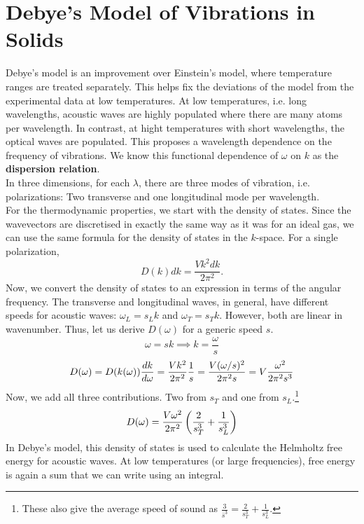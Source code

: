 \section{Debye's Model of Vibrations in Solids}
    Debye's model is an improvement over Einstein's model, where temperature ranges are treated separately. This helps fix the deviations of the model from the experimental data at low temperatures. At low temperatures, i.e. long wavelengths, acoustic waves are highly populated where there are many atoms per wavelength. In contrast, at hight temperatures with short wavelengths, the optical waves are populated. This proposes a wavelength dependence on the frequency of vibrations. We know this functional dependence of $\omega$ on $k$ as the \textbf{dispersion relation}. \\
    In three dimensions, for each $\lambda$, there are three modes of vibration, i.e. polarizations: Two transverse and one longitudinal mode per wavelength. \\
    For the thermodynamic properties, we start with the density of states. Since the wavevectors are discretised in exactly the same way as it was for an ideal gas, we can use the same formula for the density of states in the $k$-space. For a single polarization, 
    \begin{equation}
        D(k)dk = \frac{Vk^2dk}{2\pi^2}.
    \end{equation}
    Now, we convert the density of states to an expression in terms of the angular frequency. The transverse and longitudinal waves, in general, have different speeds for acoustic waves: $\omega_L=s_Lk$ and $\omega_T=s_Tk$. However, both are linear in wavenumber. Thus, let us derive $D(\omega)$ for a generic speed $s$. 
    \begin{equation}
        \omega = sk \implies k =\frac{\omega}{s}
    \end{equation}
    \begin{equation}
        D(\omega)=D(k(\omega))\frac{d k}{d \omega}=\frac{Vk^2}{2\pi^2}\frac{1}{s}=\frac{V(\omega/s)^2}{2\pi^2s}=V\frac{\omega^2}{2\pi^2s^3}
    \end{equation}
    Now, we add all three contributions. Two from $s_T$ and one from $s_L$.\footnote{These also give the average speed of sound as $\frac{3}{\bar{s}^3}=\frac{2}{s_T^3}+\frac{1}{s_L^3}$.}
    \begin{equation}
        D(\omega) = \frac{V\omega^2}{2\pi^2}\left( \frac{2}{s_T^3}+\frac{1}{s_L^3} \right)
    \end{equation}
    In Debye's model, this density of states is used to calculate the Helmholtz free energy for acoustic waves. At low temperatures (or large frequencies), free energy is again a sum that we can write using an integral.
